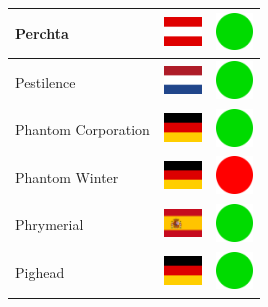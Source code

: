 \documentclass[12pt, a4paper, twoside]{report}
\begin{document}
\begin{center}
\begin{longtable}{|p{5cm}|p{2cm}|p{2cm}|}
 Perchta                                                    & \includegraphics[width=1cm]{4x3/at} &   \includegraphics[width=1cm]{likes/y} \\ \hline
 Pestilence                                                 & \includegraphics[width=1cm]{4x3/nl} &   \includegraphics[width=1cm]{likes/y} \\ \hline
 Phantom Corporation                                        & \includegraphics[width=1cm]{4x3/de} &   \includegraphics[width=1cm]{likes/y} \\ \hline
 Phantom Winter                                             & \includegraphics[width=1cm]{4x3/de} &   \includegraphics[width=1cm]{likes/n} \\ \hline
 Phrymerial                                                 & \includegraphics[width=1cm]{4x3/es} &   \includegraphics[width=1cm]{likes/y} \\ \hline
 Pighead                                                    & \includegraphics[width=1cm]{4x3/de} &   \includegraphics[width=1cm]{likes/y} \\ \hline

\end{longtable}
\end{center}
\end{document}
